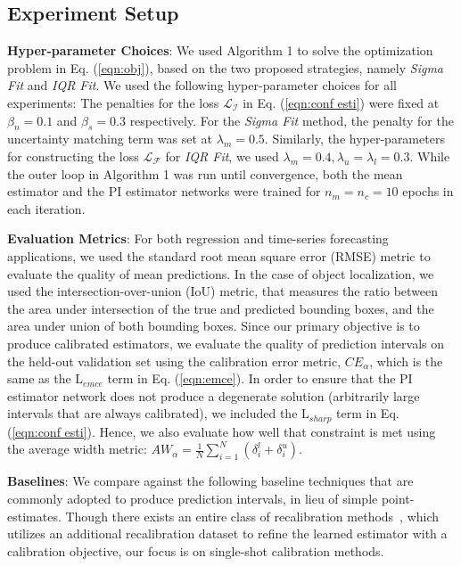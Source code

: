 \documentclass[letterpaper]{article} %
\begin{document}
\subsection{Experiment Setup}
\noindent \textbf{Hyper-parameter Choices}: We used Algorithm 1 to solve the optimization problem in Eq. (\ref{eqn:obj}), based on the two proposed strategies, namely \textit{Sigma Fit} and \textit{IQR Fit}. We used the following hyper-parameter choices for all experiments: The penalties for the loss $\mathcal{L}_{\mathcal{I}}$ in Eq. (\ref{eqn:conf esti}) were fixed at $\beta_n = 0.1$ and $\beta_s = 0.3$ respectively. For the \textit{Sigma Fit} method, the penalty for the uncertainty matching term was set at $\lambda_m = 0.5$. Similarly, the hyper-parameters for constructing the loss $\mathcal{L}_{\mathcal{F}}$ for \textit{IQR Fit}, we used $\lambda_m = 0.4, \lambda_u = \lambda_l = 0.3$. While the outer loop in Algorithm 1 was run until convergence, both the mean estimator and the PI estimator networks were trained for $n_m = n_c = 10$ epochs in each iteration.

\noindent \textbf{Evaluation Metrics}: For both regression and time-series forecasting applications, we used the standard root mean square error (RMSE) metric to evaluate the quality of mean predictions. In the case of object localization, we used the intersection-over-union (IoU) metric, that measures the ratio between the area under intersection of the true and predicted bounding boxes, and the area under union of both bounding boxes. Since our primary objective is to produce calibrated estimators, we evaluate the quality of prediction intervals on the held-out validation set using the calibration error metric, $CE_{\alpha}$, which is the same as the $\mathrm{L}_{emce}$ term in Eq. (\ref{eqn:emce}). In order to ensure that the PI estimator network does not produce a degenerate solution (arbitrarily large intervals that are always calibrated), we included the $\mathrm{L}_{sharp}$ term in Eq. (\ref{eqn:conf esti}). Hence, we also evaluate how well that constraint is met using the average width metric: $AW_{\alpha} =  \frac{1}{N}{ \sum_{i=1}^{N}(\delta_i^l+\delta_i^u)}$.


\noindent \textbf{Baselines}: We compare against the following baseline techniques that are commonly adopted to produce prediction intervals, in lieu of simple point-estimates. Though there exists an entire class of recalibration methods~\cite{kuleshov2018accurate}, which utilizes an additional recalibration dataset to refine the learned estimator with a calibration objective, our focus is on single-shot calibration methods.
\end{document}
